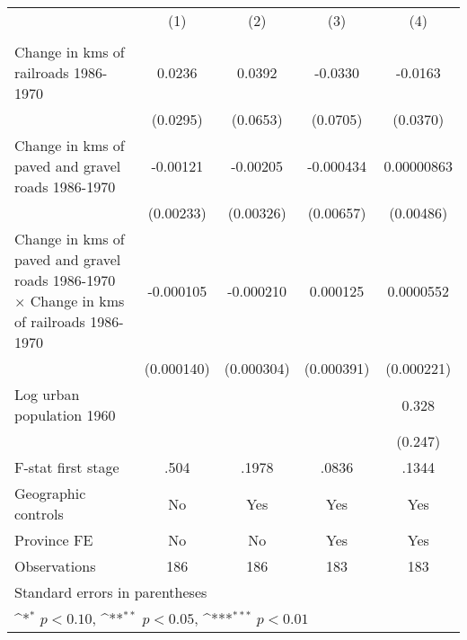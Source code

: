 {
\def\sym#1{\ifmmode^{#1}\else\(^{#1}\)\fi}
\begin{tabular}{l*{4}{c}}
\hline\hline
                &\multicolumn{1}{c}{(1)}&\multicolumn{1}{c}{(2)}&\multicolumn{1}{c}{(3)}&\multicolumn{1}{c}{(4)}\\
                &\multicolumn{1}{c}{}&\multicolumn{1}{c}{}&\multicolumn{1}{c}{}&\multicolumn{1}{c}{}\\
\hline
Change in kms of railroads 1986-1970&   0.0236         &   0.0392         &  -0.0330         &  -0.0163         \\
                & (0.0295)         & (0.0653)         & (0.0705)         & (0.0370)         \\
[1em]
Change in kms of paved and gravel roads 1986-1970& -0.00121         & -0.00205         &-0.000434         &0.00000863         \\
                &(0.00233)         &(0.00326)         &(0.00657)         &(0.00486)         \\
[1em]
Change in kms of paved and gravel roads 1986-1970 $\times$ Change in kms of railroads 1986-1970&-0.000105         &-0.000210         & 0.000125         &0.0000552         \\
                &(0.000140)         &(0.000304)         &(0.000391)         &(0.000221)         \\
[1em]
Log urban population 1960&                  &                  &                  &    0.328         \\
                &                  &                  &                  &  (0.247)         \\
\hline
F-stat first stage&     .504         &    .1978         &    .0836         &    .1344         \\
Geographic controls&       No         &      Yes         &      Yes         &      Yes         \\
Province FE     &       No         &       No         &      Yes         &      Yes         \\
Observations    &      186         &      186         &      183         &      183         \\
\hline\hline
\multicolumn{5}{l}{\footnotesize Standard errors in parentheses}\\
\multicolumn{5}{l}{\footnotesize \sym{*} \(p<0.10\), \sym{**} \(p<0.05\), \sym{***} \(p<0.01\)}\\
\end{tabular}
}
